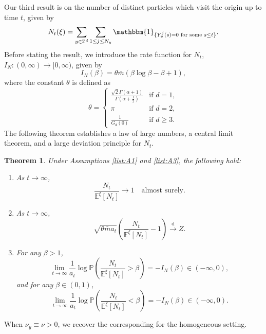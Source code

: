 \documentclass{article}[12pt]
\newtheorem{theorem}{Theorem}[section]
\theoremstyle{definition}
\newcommand{\Z}{\mathbb{Z}}
\newcommand{\1}{\mathbbm{1}}
\begin{document}
Our third result is on the number of distinct particles which visit the origin up to time $t$, given by
\begin{equation}
    N_t(\xi) = \sum_{y\in \Z^d}\sum_{1\le j \le  N_y} \1_{\{Y^j_y(s)=0 \text{ for some }s\le t\}}.
\end{equation}
Before stating the result, we introduce the rate function for $N_t$,  $I_N: (0, \infty) \to [0, \infty)$, given by
\begin{equation}
I_N(\beta) = \theta\bar{m}(\beta\log \beta - \beta + 1),
\label{eqn:rateIN}
\end{equation}
where the constant $\theta$ is defined as
\begin{equation}
\theta = \begin{cases}
    \frac{\sqrt{2}\Gamma(\alpha+1)}{\Gamma(\alpha +\frac{1}{2})} & \text{if } d=1,\\
    \pi & \text{if } d=2,\\
    \frac{1}{G_d(0)} & \text{if } d \ge 3.
\end{cases}
\label{eqn:theta}
\end{equation}
 The following theorem establishes a law of large numbers, a central limit theorem, and a large deviation principle for $N_t$.

\begin{theorem}\label{thm:Nt}
       Under Assumptions {\rm\ref{list:A1}} and {\rm\ref{list:A3}}, the following hold:
        \begin{enumerate}[label=(\alph*)]
         \item  As $t \to \infty$, 
        $$\frac{N_t}{\mathbb{E}^\xi[N_t]} \to 1 \quad \text{almost surely.}$$
         \item  As $t \to \infty$,
        $$\sqrt{\theta\bar{m}a_t}\left( \frac{N_t}{\mathbb{E}^\xi[N_t]}-1\right) \xrightarrow{\mathrm{d}}Z.$$
        \item  For any $\beta > 1$,
        $$\lim_{t \to \infty}\frac{1}{a_t}\log\mathbb{P}\left( \frac{N_t}{\mathbb{E}^\xi[N_t]}> \beta\right) = -I_N(\beta) \in (-\infty, 0),$$
        and for any $\beta \in (0, 1)$,
        $$\lim_{t \to \infty}\frac{1}{a_t}\log \mathbb{P}\left( \frac{N_t}{\mathbb{E}^\xi[N_t]}<\beta\right) = -I_N(\beta) \in (-\infty, 0).$$
    \end{enumerate}
\end{theorem}
When $\nu_y \equiv \nu>0$, we recover the corresponding \cite[Theorem~1 and Theorem~2]{CG1984} for the homogeneous setting. 
\end{document}
